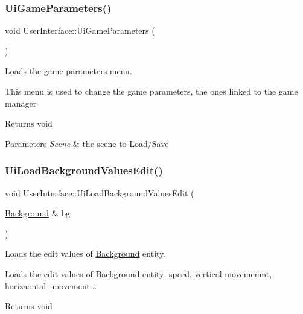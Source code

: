 \subsubsection{\texorpdfstring{Ui\+Game\+Parameters()}{UiGameParameters()}}
{\footnotesize\ttfamily void User\+Interface\+::\+Ui\+Game\+Parameters (\begin{DoxyParamCaption}{ }\end{DoxyParamCaption})}



Loads the game parameters menu. 

This menu is used to change the game parameters, the ones linked to the game manager

\begin{DoxyReturn}{Returns}
void 
\end{DoxyReturn}

\begin{DoxyParams}{Parameters}
{\em \hyperlink{class_scene}{Scene}} & the scene to Load/\+Save \\
\hline
\end{DoxyParams}
\mbox{\label{class_user_interface_a57b2c3ffd6d2f7e34644e3789be1046e}} 
\subsubsection{\texorpdfstring{Ui\+Load\+Background\+Values\+Edit()}{UiLoadBackgroundValuesEdit()}}
{\footnotesize\ttfamily void User\+Interface\+::\+Ui\+Load\+Background\+Values\+Edit (\begin{DoxyParamCaption}\item[{\hyperlink{class_background}{Background} \&}]{bg }\end{DoxyParamCaption})}



Loads the edit values of \hyperlink{class_background}{Background} entity. 

Loads the edit values of \hyperlink{class_background}{Background} entity\+: speed, vertical movememnt, horizaontal\+\_\+movement...

\begin{DoxyReturn}{Returns}
void 
\end{DoxyReturn}

